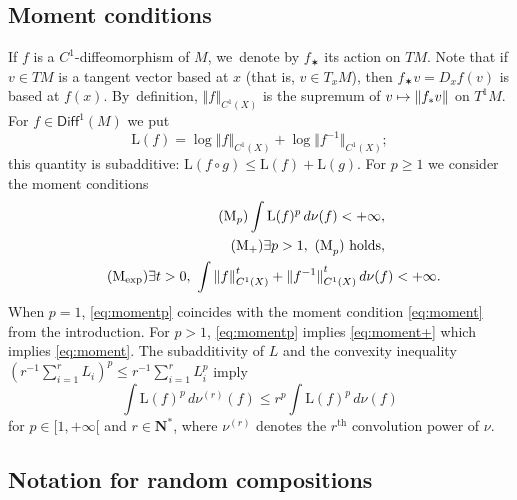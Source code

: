 \documentclass[11pt]{article}
\newcommand\mto{\mathchoice{\longmapsto}{\mapsto}{\mapsto}{\mapsto}}
\newcommand{\norm}[1]{{\left\Vert#1\right\Vert}}
\newcommand{\anorm}[1]{{\Vert#1\Vert}}
\newcommand{\inv}{^{-1}}
\def\N{\mathbf{N}}
\newcommand\Diff{{\mathsf{Diff}}}
\theoremstyle{plain}
\theoremstyle{definition}
\numberwithin{equation}{section}
\begin{document}
\subsection{Moment conditions}\label{subs:moment}
If $f$ is a $C^1$-diffeomorphism of $M$, we~denote by $f_\varstar $ its action on $TM$. Note that
if $v\in TM$ is a tangent vector based at $x$ (that is, $v\in T_xM$), then
$f_\varstar v = D_xf(v)$ is based at $f(x)$. By~definition, $\norm{f}_{C^1(X)}$ is the supremum of
$v\mto \norm{f_\varstar v}$ on $T^1M$.
For $f\in \Diff^1(M)$ we put
\begin{equation}\label{eq:subadditive_function_L}
\mathrm L(f) = \log\norm{f}_{C^1(X)}+ \log\anorm{f\inv}_{C^1(X)};
\end{equation}
this quantity is subadditive: $\mathrm L(f\circ g)\leq \mathrm L(f)+\mathrm L(g)$.
For $p\geq 1$ we consider the moment conditions
\begin{align}\label{eq:momentp}
\tag{M$_p$}
\int \mathrm L(f)^p \, d\nu (f) < + \infty, \quad \quad \quad \quad\\
\label{eq:moment+}
\tag{M$_+$}
\exists p>1, \ \mathrm{(M}_p\mathrm{)} \text{ holds}, \quad \quad \quad\quad \\
\label{eq:momentexp}
\tag{M$_{\exp}$}
\exists t>0, \ \int \norm{f}^t_{C^1(X)}+ \anorm{f\inv}^t_{C^1(X)} \, d\nu (f) < + \infty.
\end{align}
When $p=1$, \eqref{eq:momentp} coincides with the moment condition \eqref{eq:moment} from the introduction. For $p>1$, \eqref{eq:momentp}
implies \eqref{eq:moment+} which implies \eqref{eq:moment}.
The subadditivity of $L$ and the convexity inequality
$(r\inv \sum_{i=1}^r L_i)^p\leq r\inv \sum_{i=1}^r L_i^p$ imply
\begin{equation}\label{eq:Mp_iteree}
\int \mathrm L(f)^p \, d\nu^{(r)} (f) \leq r^{p} \int \mathrm L(f)^p \, d\nu (f)
\end{equation}
for $p\in [1,+\infty[$ and $r\in \N^*$, where $\nu^{(r)}$ denotes the $r^\mathrm{th}$ convolution power of $\nu$.

\subsection{Notation for random compositions} \label{subs:notation}
\end{document}
